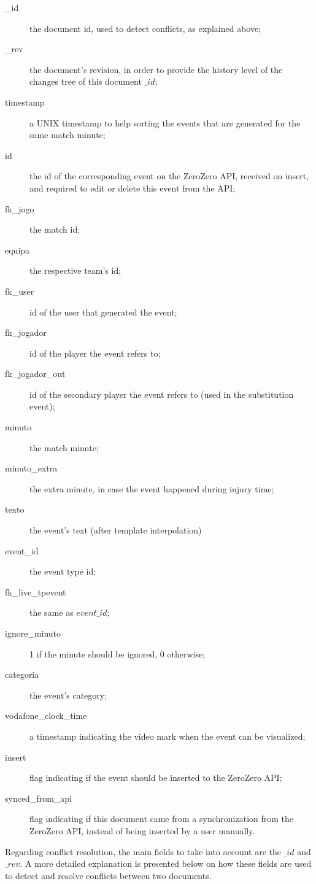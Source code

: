 \begin{description}
    \item[\_id] the document id, used to detect conflicts, as explained above;
    \item[\_rev] the document's revision, in order to provide the history level of the changes tree of this document $\_id$;
    \item[timestamp] a UNIX timestamp to help sorting the events that are generated for the same match minute;
    \item[id] the id of the corresponding event on the ZeroZero API, received on insert, and required to edit or delete this event from the API;
    \item[fk\_jogo] the match id;
    \item[equipa] the respective team's id;
    \item[fk\_user] id of the user that generated the event;    
    \item[fk\_jogador] id of the player the event refers to;    
    \item[fk\_jogador\_out] id of the secondary player the event refers to (used in the substitution event);    
    \item[minuto] the match minute;
    \item[minuto\_extra] the extra minute, in case the event happened during injury time;
    \item[texto] the event's text (after template interpolation)
    \item[event\_id] the event type id;    
    \item[fk\_live\_tpevent] the same as $event\_id$;
    \item[ignore\_minuto] 1 if the minute should be ignored, 0 otherwise;
    \item[categoria] the event's category;  
    \item[vodafone\_clock\_time] a timestamp indicating the video mark when the event can be visualized;
    \item[insert] flag indicating if the event should be inserted to the ZeroZero API;
    \item[synced\_from\_api] flag indicating if this document came from a synchronization from the ZeroZero API, instead of being inserted by a user manually. 
\end{description}

Regarding conflict resolution, the main fields to take into account are the $\_id$ and $\_rev$. A more detailed explanation is presented below on how these fields are used to detect and resolve conflicts between two documents.

